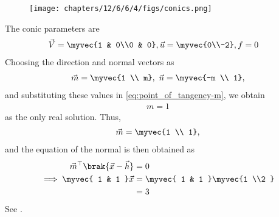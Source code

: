 	\begin{figure}[H]
		\centering
 \texttt{[image: chapters/12/6/6/4/figs/conics.png]}
		\caption{}
		\label{fig:12/6/6/4}
  	\end{figure}
The conic parameters are
\begin{align}
	\vec{V} = \myvec{1 & 0\\0 & 0},
	\vec{u} = \myvec{0\\-2},
	f &= 0
\end{align}
Choosing the direction and normal vectors as
\begin{align}
	\vec{m} = \myvec{1 \\ m}, \
	\vec{n} = \myvec{-m \\ 1}, 
\end{align}
and substituting these values in
	\eqref{eq:point_of_tangency-m},
 we obtain
\begin{align}
m = 1
\end{align}
as the only real solution.  Thus, 
\begin{align}
	\vec{m} = \myvec{1 \\ 1}, 
\end{align}
and 
	the equation of the normal is then obtained as
\begin{align}
	\vec{m}^{\top}\brak{\vec{x}-\vec{h}} &= 0
	\\
	\implies
\myvec{
1 & 1
}
		\vec{x}
	&=
\myvec{
1 & 1
}
	\myvec{1 \\2 }
	\\
	&= 3
\end{align}
		See .
